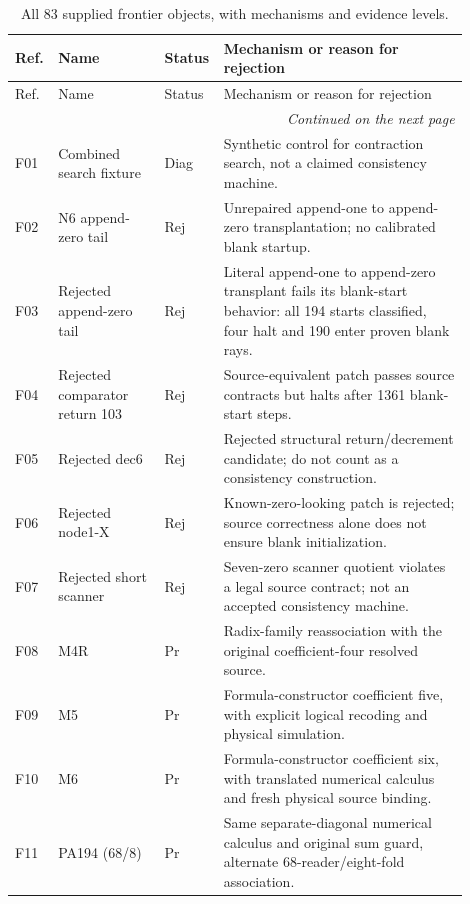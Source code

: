 \begingroup
\footnotesize
\setlength{\LTpre}{0.6\baselineskip}
\setlength{\LTpost}{0.6\baselineskip}
\begin{longtable}{@{}p{0.055\linewidth}p{0.235\linewidth}p{0.08\linewidth}p{0.535\linewidth}@{}}
\caption{All 83 supplied frontier objects, with mechanisms and evidence levels.}\label{cmp:frontier-table}\\
\toprule
Ref. & Name & Status & Mechanism or reason for rejection\\
\midrule
\endfirsthead
\toprule
Ref. & Name & Status & Mechanism or reason for rejection\\
\midrule
\endhead
\midrule
\multicolumn{4}{r}{\emph{Continued on the next page}}\\
\endfoot
\bottomrule
\endlastfoot
F01 & Combined search fixture & Diag & Synthetic control for contraction search, not a claimed consistency machine. \\
F02 & N6 append-zero tail & Rej & Unrepaired append-one to append-zero transplantation; no calibrated blank startup. \\
F03 & Rejected append-zero tail & Rej & Literal append-one to append-zero transplant fails its blank-start behavior: all 194 starts classified, four halt and 190 enter proven blank rays. \\
F04 & Rejected comparator return 103 & Rej & Source-equivalent patch passes source contracts but halts after 1361 blank-start steps. \\
F05 & Rejected dec6 & Rej & Rejected structural return/decrement candidate; do not count as a consistency construction. \\
F06 & Rejected node1-X & Rej & Known-zero-looking patch is rejected; source correctness alone does not ensure blank initialization. \\
F07 & Rejected short scanner & Rej & Seven-zero scanner quotient violates a legal source contract; not an accepted consistency machine. \\
F08 & M4R & Pr & Radix-family reassociation with the original coefficient-four resolved source. \\
F09 & M5 & Pr & Formula-constructor coefficient five, with explicit logical recoding and physical simulation. \\
F10 & M6 & Pr & Formula-constructor coefficient six, with translated numerical calculus and fresh physical source binding. \\
F11 & PA194 (68/8) & Pr & Same separate-diagonal numerical calculus and original sum guard, alternate 68-reader/eight-fold association. \\

\end{longtable}

